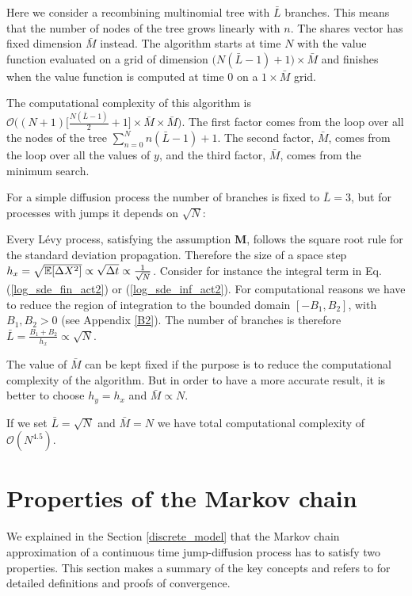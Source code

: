 \begin{Remark}
 Here we consider a recombining multinomial tree with $\bar L$ branches. This means that the number of nodes of the tree grows linearly with $n$.  
 The shares vector has fixed 
 dimension $\bar M$ instead. The algorithm starts at time $N$ with the value function evaluated on a grid of dimension $\bigl( N(\bar L-1)+1 \bigl) \times \bar M$ 
 and finishes when the value function is computed at time $0$ on a $1 \times \bar M$ grid.
\end{Remark}
\noindent
The computational complexity of this algorithm is $\mathcal{O}\biggl( (N+1)\bigl[\frac{N(\bar L-1)}{2}+1 \bigr] \times \bar M \times \bar M \biggr)$.
The first factor comes from the loop over all the nodes of the tree $\sum_{n=0}^N n(\bar L-1)+1$. The second factor, $\bar M$, comes from the loop over all the values of $y$, 
and the third factor, $\bar M$, comes from the minimum search. 

For a simple diffusion process the number of branches is fixed to $\bar L = 3$, but for processes with jumps it depends on $\sqrt N$:

\noindent
Every Lévy process, satisfying the assumption \textbf{M}, follows the square root rule for the standard deviation propagation.
Therefore the size of a space step $h_x = \sqrt{\mathbb{E}[\Delta X^2]} \propto \sqrt{\Delta t} \propto \frac{1}{\sqrt{N}}$.
Consider for instance the integral term in Eq. (\ref{log_sde_fin_act2}) or (\ref{log_sde_inf_act2}).
For computational reasons we have to reduce the region of integration to the bounded domain $[-B_1,B_2]$, with $B_1,B_2>0$ (see Appendix \ref{B2}). The number of branches is 
therefore $\bar L = \frac{B_1+B_2}{h_x} \propto \sqrt{N}$. 

The value of $\bar M$ can be kept fixed if the purpose is to reduce the computational complexity of the algorithm.
But in order to have a more accurate result, it is better to choose $h_y = h_x$ and $\bar M \propto N$.   

\noindent
If we set $\bar L = \sqrt{N}$ and $\bar M = N$ we have total computational complexity of $\mathcal{O}(N^{4.5})$. 







\section{Properties of the Markov chain} \label{B}
We explained in the Section \ref{discrete_model} that the Markov chain approximation of a continuous time jump-diffusion process
has to satisfy two properties. This section makes a summary of the key concepts 
and refers to \cite{Kushner} for detailed definitions and proofs of convergence. 
